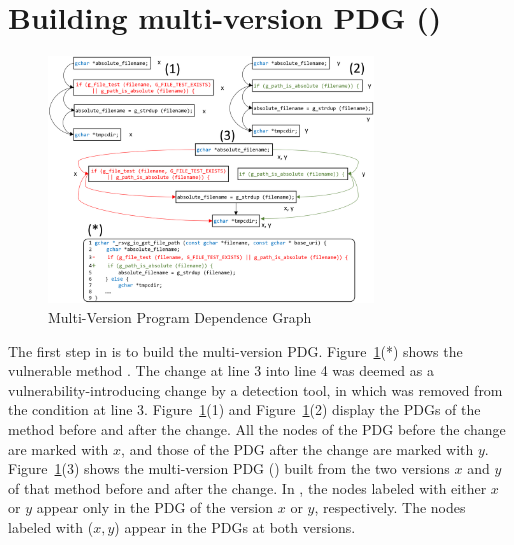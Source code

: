 \section{Building multi-version PDG ({\mvpdgxy})}
\label{delta:sec}

\begin{figure}[t]
	\centering
	\includegraphics[width=3.4in]{graphs/multi-version-pdg.png}
	\vspace{-16pt}
	\caption{Multi-Version Program Dependence Graph}
	\label{fig:multi-version-pdg}
\end{figure}

The first step in {\tool} is to build the multi-version PDG.
Figure~\ref{fig:multi-version-pdg}(*) shows the vulnerable method
. The change at line 3 into line 4 was
deemed as a vulnerability-introducing change by a detection tool, in
which   was
removed from the condition at line
3. Figure~\ref{fig:multi-version-pdg}(1)
and Figure~\ref{fig:multi-version-pdg}(2) display the PDGs of the method
 before and after the change. All the
nodes of the PDG before the change are marked with $x$, and those of
the PDG after the change are marked with
$y$. Figure~\ref{fig:multi-version-pdg}(3) shows the multi-version
PDG ({\mvpdgxy}) built from the two versions $x$ and
$y$ of that method before and after the change. In {\mvpdgxy}, the
nodes labeled with either $x$ or $y$ appear only in the PDG of the
version $x$ or $y$, respectively. The nodes labeled with ($x,y$)
appear in the PDGs at both versions.



